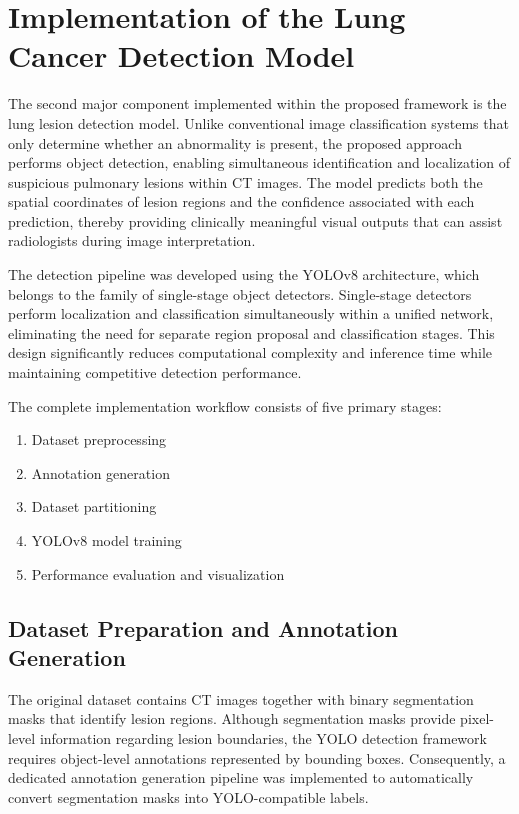 \section[CT Model Implementation]{Implementation of the Lung Cancer Detection Model}
The second major component implemented within the proposed framework is the lung lesion detection model. Unlike conventional image classification systems that only determine whether an abnormality is present, the proposed approach performs object detection, enabling simultaneous identification and localization of suspicious pulmonary lesions within CT images. The model predicts both the spatial coordinates of lesion regions and the confidence associated with each prediction, thereby providing clinically meaningful visual outputs that can assist radiologists during image interpretation.

The detection pipeline was developed using the YOLOv8 architecture, which belongs to the family of single-stage object detectors. Single-stage detectors perform localization and classification simultaneously within a unified network, eliminating the need for separate region proposal and classification stages. This design significantly reduces computational complexity and inference time while maintaining competitive detection performance.

The complete implementation workflow consists of five primary stages:
\begin{enumerate}
	\item Dataset preprocessing
	\item Annotation generation
	\item Dataset partitioning
	\item YOLOv8 model training
	\item Performance evaluation and visualization
\end{enumerate}

\subsection{Dataset Preparation and Annotation Generation}
The original dataset contains CT images together with binary segmentation masks that identify lesion regions. Although segmentation masks provide pixel-level information regarding lesion boundaries, the YOLO detection framework requires object-level annotations represented by bounding boxes. Consequently, a dedicated annotation generation pipeline was implemented to automatically convert segmentation masks into YOLO-compatible labels.

